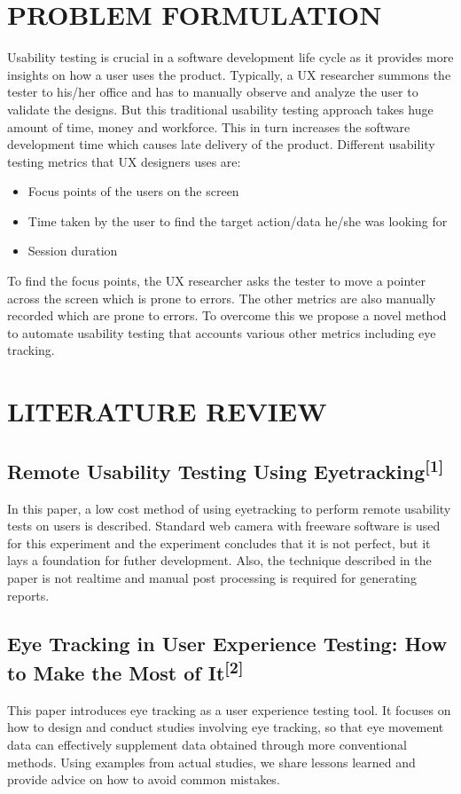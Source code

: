 \documentclass[hidelinks,12pt,a4paper,final]{extreport}
\begin{document}
\chapter{PROBLEM FORMULATION}
\vspace{0.3cm}
Usability testing is crucial in a software development life cycle as it provides more insights
on how a user uses the product. Typically, a UX researcher summons the tester to his/her office
and has to manually observe and analyze the user to validate the designs. But this traditional
usability testing approach takes huge amount of time, money and workforce. This in turn
increases the software development time which causes late delivery of the product. Different
usability testing metrics that UX designers uses are:
\begin{itemize}
    \item Focus points of the users on the screen
    \item Time taken by the user to find the target action/data he/she was looking for
    \item Session duration
\end{itemize}
To find the focus points, the UX researcher asks the tester to move a pointer across the
screen which is prone to errors. The other metrics are also manually recorded which are prone
to errors. To overcome this we propose a novel method to automate usability testing that accounts
various other metrics including eye tracking.


\newpage
\chapter{LITERATURE REVIEW}
\section{Remote Usability Testing Using Eyetracking\textsuperscript{[1]}}
In this paper, a low cost method of using eyetracking to perform remote usability tests on users is described. Standard web camera with freeware software is used for this experiment and the experiment concludes that it is not perfect, but it lays a foundation for futher development. Also, the technique described in the paper is not realtime and manual post processing is required for generating reports.

\section{Eye Tracking in User Experience Testing:
How to Make the Most of It\textsuperscript{[2]}}
This paper introduces eye tracking as a user experience testing tool. It focuses on how to design and conduct studies involving eye tracking, so that eye movement data can effectively supplement data obtained through more conventional methods. Using examples from actual studies, we share lessons learned and provide advice on how to avoid common mistakes. 
\end{document}
